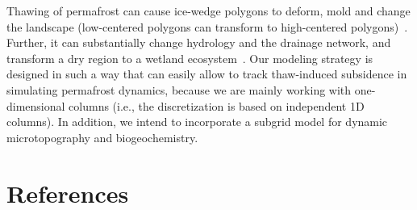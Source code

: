 \documentclass[review]{elsarticle}
\begin{document}
Thawing of permafrost can cause ice-wedge polygons to deform, mold and change the landscape (low-centered polygons can transform to high-centered polygons)~\cite{jorgenson2006abrupt,liljedahl2012ice}. Further, it can substantially change hydrology and the drainage network, and transform a dry region to a wetland ecosystem~\cite{rowland2010arctic}. Our modeling strategy is designed in such a way that can easily allow to track thaw-induced subsidence in simulating permafrost dynamics, because we are mainly working with one-dimensional columns (i.e., the discretization is based on independent 1D columns). In addition, we intend to incorporate a subgrid model for dynamic microtopography and biogeochemistry. 






\section*{References}


\end{document}
